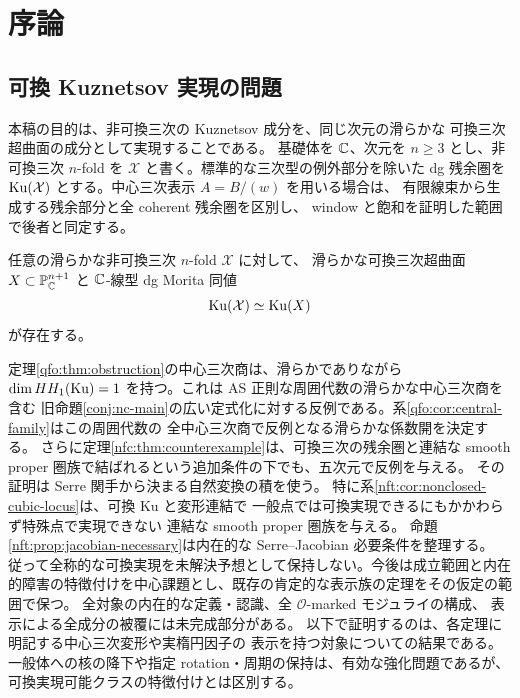 \section{序論}
\label{sec:introduction}

\subsection{可換 Kuznetsov 実現の問題}

本稿の目的は、非可換三次の Kuznetsov 成分を、同じ次元の滑らかな
可換三次超曲面の成分として実現することである。
基礎体を $\mathbb C$、次元を $n\ge3$ とし、非可換三次 $n$-fold を
$\mathcal X$ と書く。標準的な三次型の例外部分を除いた dg 残余圏を
$\operatorname{Ku}(\mathcal X)$ とする。中心三次表示 $A=B/(w)$ を用いる場合は、
有限線束から生成する残余部分と全 coherent 残余圏を区別し、
window と飽和を証明した範囲で後者と同定する。

\begin{remark}
\label{conj:nc-main}
任意の滑らかな非可換三次 $n$-fold $\mathcal X$ に対して、
滑らかな可換三次超曲面 $X\subset\mathbb P^{n+1}_{\mathbb C}$ と
$\mathbb C$-線型 dg Morita 同値
\[
 \operatorname{Ku}(\mathcal X)\simeq\operatorname{Ku}(X)
\]
が存在する。
\end{remark}

定理\ref{qfo:thm:obstruction}の中心三次商は、滑らかでありながら
$\dim HH_1(\operatorname{Ku})=1$ を持つ。これは AS 正則な周囲代数の滑らかな中心三次商を含む
旧命題\ref{conj:nc-main}の広い定式化に対する反例である。系\ref{qfo:cor:central-family}はこの周囲代数の
全中心三次商で反例となる滑らかな係数開を決定する。
さらに定理\ref{nfc:thm:counterexample}は、可換三次の残余圏と連結な
smooth proper 圏族で結ばれるという追加条件の下でも、五次元で反例を与える。
その証明は Serre 関手から決まる自然変換の積を使う。
特に系\ref{nft:cor:nonclosed-cubic-locus}は、可換 Ku と変形連結で
一般点では可換実現できるにもかかわらず特殊点で実現できない
連結な smooth proper 圏族を与える。
命題\ref{nft:prop:jacobian-necessary}は内在的な Serre--Jacobian 必要条件を整理する。
従って全称的な可換実現を未解決予想として保持しない。今後は成立範囲と内在的障害の特徴付けを中心課題とし、既存の肯定的な表示族の定理をその仮定の範囲で保つ。
全対象の内在的な定義・認識、全 $\mathcal O$-marked モジュライの構成、
表示による全成分の被覆には未完成部分がある。
以下で証明するのは、各定理に明記する中心三次変形や実楕円因子の
表示を持つ対象についての結果である。
一般体への核の降下や指定 rotation・周期の保持は、有効な強化問題であるが、
可換実現可能クラスの特徴付けとは区別する。

